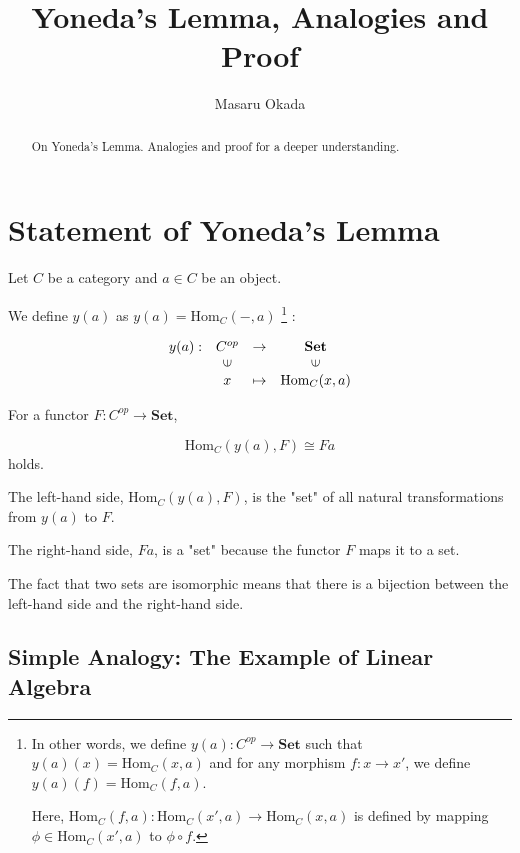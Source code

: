\documentclass[uplatex,a4j,12pt,dvipdfmx]{jsarticle}
\title{
Yoneda's Lemma, Analogies and Proof
}
\author{
Masaru Okada
}
\begin{document}
\maketitle

\begin{abstract}
	On Yoneda's Lemma. Analogies and proof for a deeper understanding.
\end{abstract}

\section{Statement of Yoneda's Lemma}

Let $C$ be a category and $a \in C$ be an object.

We define $y(a)$ as $y(a) = \text{Hom}_{C}(-,a)$
\footnote{
	In other words, we define $y(a) : C^{op} \to \textbf{Set}$ such that $y(a)(x) = \text{Hom}_{C}(x,a)$ and for any morphism $f: x \to x'$, we define $y(a)(f) = \text{Hom}_{C}(f,a)$.

	Here, $\text{Hom}_{C}(f,a): \text{Hom}_{C}(x',a) \to \text{Hom}_{C}(x,a)$ is defined by mapping $\phi \in \text{Hom}_{C}(x',a)$ to $\phi \circ f$.
}
:

\[
	\begin{array}{cccc}
		y(a) : & C^{op}                  & \to     & \textbf{Set}            \\
		       & \rotatebox{90}{${\in}$} &         & \rotatebox{90}{${\in}$} \\
		       & x                       & \mapsto & \text{Hom}_{C}(x,a)
	\end{array}
\]

For a functor $F: C^{op} \to \textbf{Set}$,

\[
	\text{Hom}_{C}(y(a),F) \cong Fa
\]
holds.

The left-hand side,
$\text{Hom}_{C}(y(a),F)$,
is the "set" of all natural transformations from $y(a)$ to $F$.

The right-hand side, $Fa$, is a "set" because the functor $F$ maps it to a set.

The fact that two sets are isomorphic means that there is a bijection between the left-hand side and the right-hand side.



\subsection{Simple Analogy: The Example of Linear Algebra}
\end{document}
